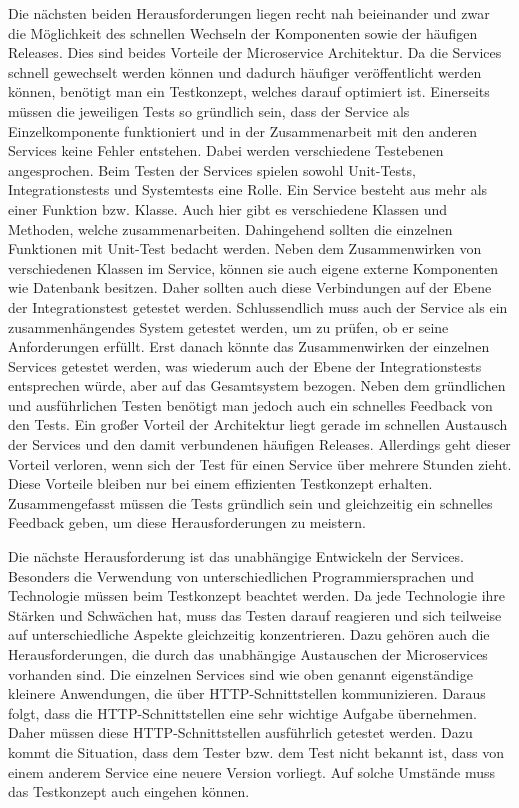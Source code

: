 \documentclass{llncs}
\begin{document}
Die nächsten beiden Herausforderungen liegen recht nah beieinander und zwar die Möglichkeit des schnellen Wechseln der Komponenten sowie der häufigen Releases. Dies sind beides Vorteile der Microservice Architektur. Da die Services schnell gewechselt werden können und dadurch häufiger veröffentlicht werden können, benötigt man ein Testkonzept, welches darauf optimiert ist. Einerseits müssen die jeweiligen Tests so gründlich sein, dass der Service als Einzelkomponente funktioniert und in der Zusammenarbeit mit den anderen Services keine Fehler entstehen. Dabei werden verschiedene Testebenen angesprochen. Beim Testen der Services spielen sowohl Unit-Tests, Integrationstests und Systemtests eine Rolle. Ein Service besteht aus mehr als einer Funktion bzw. Klasse. Auch hier gibt es verschiedene Klassen und Methoden, welche zusammenarbeiten. Dahingehend sollten die einzelnen Funktionen mit Unit-Test bedacht werden. Neben dem Zusammenwirken von verschiedenen Klassen im Service, können sie auch eigene externe Komponenten wie Datenbank besitzen. Daher sollten auch diese Verbindungen auf der Ebene der Integrationstest getestet werden. Schlussendlich muss auch der Service als ein zusammenhängendes System getestet werden, um zu prüfen, ob er seine Anforderungen erfüllt. Erst danach könnte das Zusammenwirken der einzelnen Services getestet werden, was wiederum auch der Ebene der Integrationstests entsprechen würde, aber auf das Gesamtsystem bezogen.
Neben dem gründlichen und ausführlichen Testen benötigt man jedoch auch ein schnelles Feedback von den Tests. Ein großer Vorteil der Architektur liegt gerade im schnellen Austausch der Services und den damit verbundenen häufigen Releases. Allerdings geht dieser Vorteil verloren, wenn sich der Test für einen Service über mehrere Stunden zieht. Diese Vorteile bleiben nur bei einem effizienten Testkonzept erhalten. Zusammengefasst müssen die Tests gründlich sein und gleichzeitig ein schnelles Feedback geben, um diese Herausforderungen zu meistern.

Die nächste Herausforderung ist das unabhängige Entwickeln der Services. Besonders die Verwendung von unterschiedlichen Programmiersprachen und Technologie müssen beim Testkonzept beachtet werden. Da jede Technologie ihre Stärken und Schwächen hat, muss das Testen darauf reagieren und sich teilweise auf unterschiedliche Aspekte gleichzeitig konzentrieren. Dazu gehören auch die Herausforderungen, die durch das unabhängige Austauschen der Microservices vorhanden sind. Die einzelnen Services sind wie oben genannt eigenständige kleinere Anwendungen, die über HTTP-Schnittstellen kommunizieren. Daraus folgt, dass die HTTP-Schnittstellen eine sehr wichtige Aufgabe übernehmen. Daher müssen diese HTTP-Schnittstellen ausführlich getestet werden. Dazu kommt die Situation, dass dem Tester bzw. dem Test nicht bekannt ist, dass von einem anderem Service eine neuere Version vorliegt. Auf solche Umstände muss das Testkonzept auch eingehen können.
\end{document}

